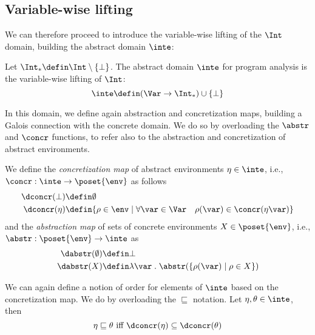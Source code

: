 \subsection{Variable-wise lifting}
\label{sub:vwintervals}

We can therefore proceed to introduce the variable-wise lifting of the
\(\Int\) domain, building the abstract domain \(\inte\):

\begin{definition}
  Let \(\Int_* \defin \Int \setminus \{\bot\}\). The abstract domain
  \(\inte\) for program analysis is the variable-wise lifting of
  \(\Int\):
  \[ \inte \defin (\Var \to \Int_*) \cup \{ \bot \} \]
\end{definition}

In this domain, we define again abstraction and concretization maps,
building a Galois connection with the concrete domain. We do so by
overloading the \(\abstr\) and \(\concr\) functions, to refer also to
the abstraction and concretization of abstract environments.

\begin{definition}\label{def:vwabstr}
  We define the \emph{concretization map} of abstract environments
  \(\eta \in \inte\), i.e., \(\concr : \inte \to \poset{\env}\) as
  follows
  \begin{align*}
    \dconcr(\bot) & \defin \emptyset \\
    \dconcr(\eta) & \defin \{\rho \in \env \mid \forall \var \in \Var \quad \rho(\var) \in \concr(\eta\var)\}
  \end{align*}
  and the \emph{abstraction map} of sets of concrete environments
  \(X \in \poset{\env}\), i.e., \(\abstr : \poset{\env} \to \inte\) as
  \begin{align*}
    \dabstr(\emptyset) & \defin \bot \\
    \dabstr(X) & \defin \lambda \var \; . \; \abstr(\{\rho(\var) \mid \rho \in X\})
  \end{align*}
\end{definition}

We can again define a notion of order for elements of \(\inte\) based
on the concretization map. We do by overloading the 
\(\sqsubseteq\) notation. Let \(\eta, \theta \in \inte\), then
\begin{equation*}
  \eta \sqsubseteq \theta \text{ iff } \dconcr(\eta) \subseteq \dconcr(\theta)
\end{equation*}


